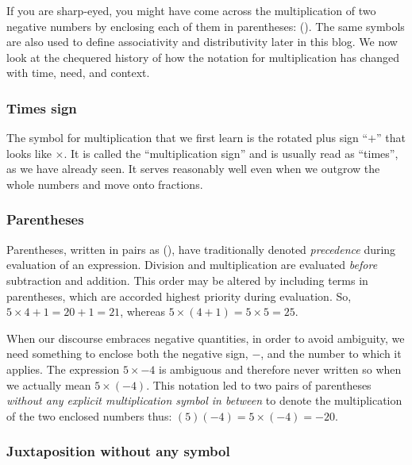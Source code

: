 \documentclass[
  a4paper,
]{article}
\begin{document}
If you are sharp-eyed, you might have come across the multiplication of
two negative numbers by enclosing each of them in parentheses: (). The
same symbols are also used to define associativity and distributivity
later in this blog. We now look at the chequered history of how the
notation for multiplication has changed with time, need, and context.

\hypertarget{times-sign}{%
\subsubsection{Times sign}\label{times-sign}}

The symbol for multiplication that we first learn is the rotated plus
sign ``\(+\)'' that looks like \(\times\). It is called the
``multiplication sign'' and is usually read as ``times'', as we have
already seen. It serves reasonably well even when we outgrow the whole
numbers and move onto fractions.

\hypertarget{parentheses}{%
\subsubsection{Parentheses}\label{parentheses}}

Parentheses, written in pairs as (), have traditionally denoted
\emph{precedence} during evaluation of an expression. Division and
multiplication are evaluated \emph{before} subtraction and addition.
This order may be altered by including terms in parentheses, which are
accorded highest priority during evaluation. So,
\(5 \times 4 + 1 = 20 + 1 = 21\), whereas
\(5 \times (4 + 1) = 5 \times 5 = 25\).

When our discourse embraces negative quantities, in order to avoid
ambiguity, we need something to enclose both the negative sign, \(-\),
and the number to which it applies. The expression \(5 \times -4\) is
ambiguous and therefore never written so when we actually mean
\(5 \times (-4)\). This notation led to two pairs of parentheses
\emph{without any explicit multiplication symbol in between} to denote
the multiplication of the two enclosed numbers thus:
\((5)(-4) = 5 \times (-4) = -20\).

\hypertarget{juxtaposition-without-any-symbol}{%
\subsubsection{Juxtaposition without any
symbol}\label{juxtaposition-without-any-symbol}}
\end{document}
